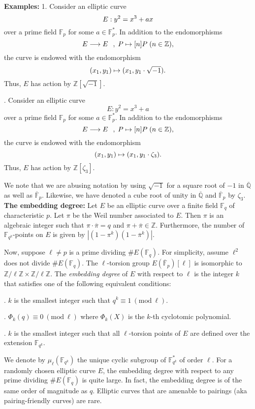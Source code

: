 \documentclass[11pt, lettersize, notitlepage, leqno, footskip=0.6cm]{article}
\newcommand{\bF}{\mathbb F}
\newcommand{\bz}{\mathbb Z}
\newcommand{\bq}{\mathbb Q}
\newcommand{\bFp}{\mathbb{F}_p}
\newcommand{\bFP}{\ov{\mathbb{F}}_p}
\newcommand{\bFq}{\mathbb{F}_q}
\newcommand{\bFqk}{\mathbb{F}_{q^k}}
\newcommand{\lra}{\longrightarrow}
\newcommand{\ov}{\overline}
\newcommand{\vs}{\vspace{-2mm}}
\newcommand{\noin}{\noindent}
\newcommand{\Mod}[1]{\ (\mathrm{mod}\ #1)}
\numberwithin{equation}{section}
\begin{document}
\noin \textbf{Examples:} 1. Consider an elliptic curve \vs $$E:y^2 = x^3 + ax \vs $$ over a prime field $\bFp$ for some $a\in \bFp^*$. In addition to the endomorphisms \vs $$E\lra E\;\,\;,\; P\mapsto [n]P\;(n\in\bz),    \vs $$ the curve is endowed with the endomorphism \vs $$(x_1,y_1)\mapsto (x_1,y_1\cdot\sqrt{-1}). \vs $$ Thus, $E$ has action by $\bz[\sqrt{-1}]$.\vspace{1.5mm}

\noin 2. Consider an elliptic curve \vs $$E:y^2 = x^3 + a  $$ over a prime field $\bFp$ for some $a\in \bFp^*$. In addition to the endomorphisms \vs $$E\lra E\;\,\;,\; P\mapsto [n]P\;(n\in\bz),    \vs $$ the curve is endowed with the endomorphism \vs $$(x_1,y_1)\mapsto (x_1,y_1\cdot\zeta_3). \vs $$ Thus, $E$ has action by $\bz[\zeta_3]$. \vspace{1.5mm}

We note that we are abusing notation by using $\sqrt{-1}$ for a square root of $-1$ in $\ov{\bq}$ as well as $\bFP$. Likewise, we have denoted a cube root of unity in $\ov{\bq}$ and $\bFP$ by $\zeta_3$.\\

\noin \textbf{The embedding degree:} Let $E$ be an elliptic curve over a finite field $\bFq$  of characteristic $p$. Let $\pi$ be the Weil number associated to $E$. Then $\pi$ is an algebraic integer such that $\pi\cdot \ov{\pi} = q$ and $\pi+\ov{\pi}\in \bz$. Furthermore, the number of $\bFqk$-points on $E$ is given by $|(1-\pi^k)(1-\ov{\pi}^k)|$.


Now, suppose $\ell\neq p$ is a prime dividing $\# E(\bFq)$. For simplicity, assume $\ell^2$ does not divide $\# E(\bFq)$. The $\ell$-torsion group $E(\bFP)[\ell]$ is isomorphic to $\bz/\ell\bz \times \bz/\ell\bz$. The \textit{embedding degree} of $E$ with respect to $\ell$ is the integer $k$ that satisfies one of the following equivalent conditions: \vspace{0.1cm}

\noin 1. $k$ is the smallest integer such that $q^k\equiv 1\Mod{\ell}$.

\noin 2. $\Phi_k(q)\equiv 0\Mod{\ell}$ where $\Phi_k(X)$ is the $k$-th cyclotomic polynomial.

\noin 3. $k$ is the smallest integer such that all $\ell$-torsion points of $E$ are defined over the extension $\bFqk$. \vspace{0.05cm}


We denote by $\mu_{\ell}(\bF _{q^k})$ the unique cyclic subgroup of $\bF _{q^k}^*$ of order $\ell$. For a randomly chosen elliptic curve $E$, the embedding degree with respect to any prime dividing $\# E(\bFq)$ is quite large. In fact, the embedding degree is of the same order of magnitude as $q$. Elliptic curves that are amenable to pairings (aka pairing-friendly curves) are rare.
\end{document}
